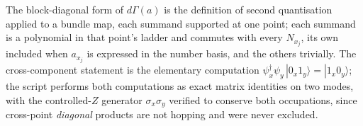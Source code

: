 The block-diagonal form of $d\Gamma(a)$ is the definition of second quantisation applied to a bundle map, each summand supported at one point; each summand is a polynomial in that point's ladder and commutes with every $N_{x_j}$, its own included when $a_{x_j}$ is expressed in the number basis, and the others trivially. The cross-component statement is the elementary computation $\psi^{\dagger}_x\psi_y\,|0_x 1_y\rangle = |1_x 0_y\rangle$; the script performs both computations as exact matrix identities on two modes, with the controlled-$Z$ generator $\sigma_x\sigma_y$ verified to conserve both occupations, since cross-point \emph{diagonal} products are not hopping and were never excluded.
